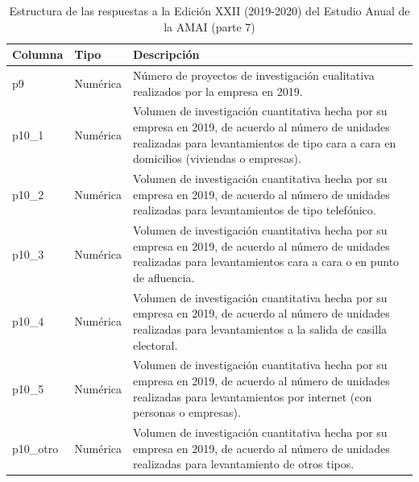 \begin{table}[]
\caption{Estructura de las respuestas a la Edición XXII (2019-2020) del Estudio Anual de la AMAI (parte 7)}
\label{tab:raw2019_7}
\begin{tabular}{|l|l|l|}
\hline
Columna &
  Tipo &
  Descripción \\ \hline
p9 &
  Numérica &
  \parbox[t]{9cm}{Número de proyectos de investigación cualitativa realizados por la empresa en 2019.\vspace{0.1cm}} \\ \hline
p10\_1 &
  Numérica &
  \parbox[t]{9cm}{Volumen de investigación cuantitativa hecha por su empresa en 2019, de acuerdo al número de unidades realizadas para levantamientos de tipo cara a cara en domicilios (viviendas o empresas).\vspace{0.1cm}} \\ \hline
p10\_2 &
  Numérica &
  \parbox[t]{9cm}{Volumen de investigación cuantitativa hecha por su empresa en 2019, de acuerdo al número de unidades realizadas para levantamientos de tipo telefónico.\vspace{0.1cm}} \\ \hline
p10\_3 &
  Numérica &
  \parbox[t]{9cm}{Volumen de investigación cuantitativa hecha por su empresa en 2019, de acuerdo al número de unidades realizadas para levantamientos cara a cara o en punto de afluencia.\vspace{0.1cm}} \\ \hline
p10\_4 &
  Numérica &
  \parbox[t]{9cm}{Volumen de investigación cuantitativa hecha por su empresa en 2019, de acuerdo al número de unidades realizadas para levantamientos a la salida de casilla electoral.\vspace{0.1cm}} \\ \hline
p10\_5 &
  Numérica &
  \parbox[t]{9cm}{Volumen de investigación cuantitativa hecha por su empresa en 2019, de acuerdo al número de unidades realizadas para levantamientos por internet (con personas o empresas).\vspace{0.1cm}} \\ \hline
p10\_otro &
  Numérica &
  \parbox[t]{9cm}{Volumen de investigación cuantitativa hecha por su empresa en 2019, de acuerdo al número de unidades realizadas para levantamiento de otros tipos.\vspace{0.1cm}} \\ \hline
\end{tabular}
\end{table}


